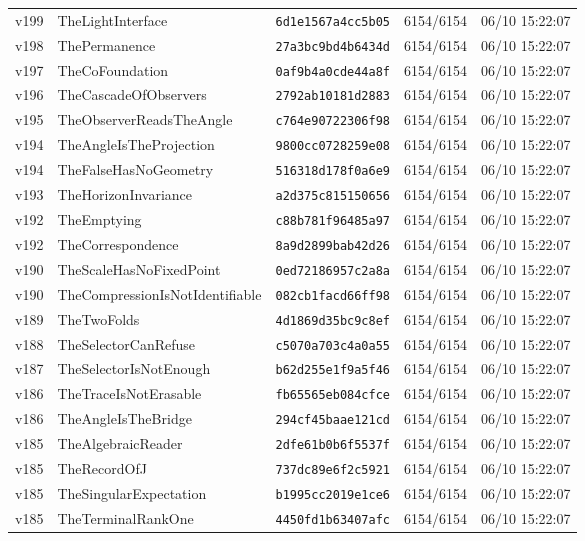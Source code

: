 \documentclass[11pt]{article}
\theoremstyle{definition}\newtheorem{deriv}{Derivation}
\begin{document}
{\begin{longtable}{@{}lllll@{}}
v199 & TheLightInterface & \texttt{6d1e1567a4cc5b05} & 6154/6154 & 06/10 15:22:07 \\
v198 & ThePermanence & \texttt{27a3bc9bd4b6434d} & 6154/6154 & 06/10 15:22:07 \\
v197 & TheCoFoundation & \texttt{0af9b4a0cde44a8f} & 6154/6154 & 06/10 15:22:07 \\
v196 & TheCascadeOfObservers & \texttt{2792ab10181d2883} & 6154/6154 & 06/10 15:22:07 \\
v195 & TheObserverReadsTheAngle & \texttt{c764e90722306f98} & 6154/6154 & 06/10 15:22:07 \\
v194 & TheAngleIsTheProjection & \texttt{9800cc0728259e08} & 6154/6154 & 06/10 15:22:07 \\
v194 & TheFalseHasNoGeometry & \texttt{516318d178f0a6e9} & 6154/6154 & 06/10 15:22:07 \\
v193 & TheHorizonInvariance & \texttt{a2d375c815150656} & 6154/6154 & 06/10 15:22:07 \\
v192 & TheEmptying & \texttt{c88b781f96485a97} & 6154/6154 & 06/10 15:22:07 \\
v192 & TheCorrespondence & \texttt{8a9d2899bab42d26} & 6154/6154 & 06/10 15:22:07 \\
v190 & TheScaleHasNoFixedPoint & \texttt{0ed72186957c2a8a} & 6154/6154 & 06/10 15:22:07 \\
v190 & TheCompressionIsNotIdentifiable & \texttt{082cb1facd66ff98} & 6154/6154 & 06/10 15:22:07 \\
v189 & TheTwoFolds & \texttt{4d1869d35bc9c8ef} & 6154/6154 & 06/10 15:22:07 \\
v188 & TheSelectorCanRefuse & \texttt{c5070a703c4a0a55} & 6154/6154 & 06/10 15:22:07 \\
v187 & TheSelectorIsNotEnough & \texttt{b62d255e1f9a5f46} & 6154/6154 & 06/10 15:22:07 \\
v186 & TheTraceIsNotErasable & \texttt{fb65565eb084cfce} & 6154/6154 & 06/10 15:22:07 \\
v186 & TheAngleIsTheBridge & \texttt{294cf45baae121cd} & 6154/6154 & 06/10 15:22:07 \\
v185 & TheAlgebraicReader & \texttt{2dfe61b0b6f5537f} & 6154/6154 & 06/10 15:22:07 \\
v185 & TheRecordOfJ & \texttt{737dc89e6f2c5921} & 6154/6154 & 06/10 15:22:07 \\
v185 & TheSingularExpectation & \texttt{b1995cc2019e1ce6} & 6154/6154 & 06/10 15:22:07 \\
v185 & TheTerminalRankOne & \texttt{4450fd1b63407afc} & 6154/6154 & 06/10 15:22:07 \\

\end{longtable}}
\end{document}
